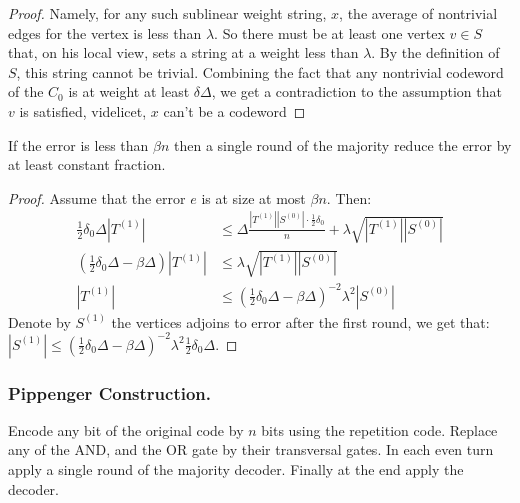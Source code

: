 \documentclass[manuscript,screen,review]{acmart}
\begin{document}
{\begin{proof}
  Namely, for any such sublinear weight string, $x$, the average of nontrivial edges for the vertex is less than $\lambda$. So there must be at least one vertex $v \in S$ that, on his local view, sets a  string at a weight less than $\lambda$. By the definition of $S$, this string cannot be trivial. Combining the fact that any nontrivial codeword of the $C_{0}$ is at weight at least $\delta\Delta$, we get a contradiction to the assumption that $v$ is satisfied, videlicet, $x$ can't be a codeword \end{proof}

  \begin{lemma}
    If the error is less than $\beta n $ then a single round of the  majority reduce the error by at least constant fraction. 
  \end{lemma}
  \begin{proof}
Assume that the error $e$ is at size at most $\beta n$. Then: \begin{equation*}
  \begin{split}
    \frac{1}{2}\delta_{0}\Delta |T^{(1)}| & \le \Delta \frac{|T^{(1)}||S^{(0)}|\cdot \frac{1}{2}\delta_{0}}{n} + \lambda\sqrt{|T^{(1)}||S^{(0)}|} \\ 
  \left( \frac{1}{2} \delta_{0} \Delta - \beta \Delta \right) |T^{(1)}| & \le \lambda \sqrt{|T^{(1)}||S^{(0)}|} \\ 
|T^{(1)}| & \le \left( \frac{1}{2} \delta_{0} \Delta - \beta \Delta \right)^{-2}\lambda^{2} |S^{(0)}| 
  \end{split}
\end{equation*}
Denote by $S^{(1)}$ the vertices adjoins to error after the first round, we get that: $|S^{(1)}| \le \left( \frac{1}{2} \delta_{0} \Delta - \beta \Delta \right)^{-2}\lambda^{2} \frac{1}{2} \delta_{0} \Delta$. 
\end{proof}

\subsubsection{Pippenger Construction.} Encode any bit of the original code by $n$ bits using the repetition code. Replace any of the AND, and the OR gate by their transversal gates. In each even turn apply a single round of the majority decoder. Finally at the end apply the decoder.  





}
\end{document}
